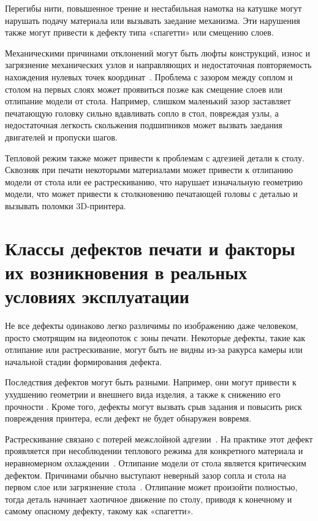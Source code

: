 Перегибы нити, повышенное трение и нестабильная намотка на катушке могут нарушать подачу материала или вызывать заедание механизма. Эти нарушения также могут привести к дефекту типа «спагетти» или смещению слоев.

Механическими причинами отклонений могут быть люфты конструкций, износ и загрязнение механических узлов и направляющих и недостаточная повторяемость нахождения нулевых точек координат~\cite{gunaydin2018common}. Проблема с зазором между соплом и столом на первых слоях может проявиться позже как смещение слоев или отлипание модели от стола. Например, слишком маленький зазор заставляет печатающую головку сильно вдавливать сопло в стол, повреждая узлы, а недостаточная легкость скольжения подшипников может вызвать заедания двигателей и пропуски шагов.

Тепловой режим также может привести к проблемам с адгезией детали к столу. Сквозняк при печати некоторыми материалами может привести к отлипанию модели от стола или ее растрескиванию, что нарушает изначальную геометрию модели, что может привести к столкновению печатающей головы с деталью и вызывать поломки 3D-принтера.

\section{Классы дефектов печати и факторы их возникновения в реальных условиях эксплуатации}

Не все дефекты одинаково легко различимы по изображению даже человеком, просто смотрящим на видеопоток с зоны печати. Некоторые дефекты, такие как отлипание или растрескивание, могут быть не видны из-за ракурса камеры или начальной стадии формирования дефекта.

Последствия дефектов могут быть разными. Например, они могут привести к ухудшению геометрии и внешнего вида изделия, а также к снижению его прочности \cite{lishchenko2022online}. Кроме того, дефекты могут вызвать срыв задания и повысить риск повреждения принтера, если дефект не будет обнаружен вовремя.

Растрескивание связано с потерей межслойной адгезии~\cite{петров2017влиянии}. На практике этот дефект проявляется при несоблюдении теплового режима для конкретного материала и неравномерном охлаждении~\cite{кондрашов2019влияние,дожделев2019обзор}. Отлипание модели от стола является критическим дефектом. Причинами обычно выступают неверный зазор сопла и стола на первом слое или загрязнение стола~\cite{gunaydin2018common}. Отлипание может произойти полностью, тогда деталь начинает хаотичное движение по столу, приводя к конечному и самому опасному дефекту, такому как «спагетти».

